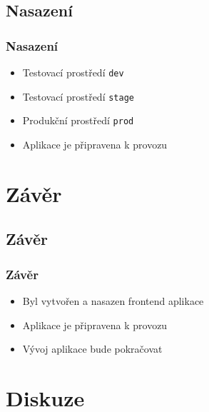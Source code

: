 \documentclass[a4paper]{beamer}
\begin{document}
\subsection*{Nasazení}
\begin{frame}
\frametitle{Nasazení}
\begin{itemize}
    \item Testovací prostředí \texttt{dev}
    \item Testovací prostředí \texttt{stage}
    \item Produkční prostředí \texttt{prod}
    \item Aplikace je připravena k provozu
\end{itemize}
\end{frame}

\section{Závěr}

\subsection*{Závěr}
\begin{frame}
\frametitle{Závěr}
\begin{itemize}
\item Byl vytvořen a nasazen frontend aplikace
\item Aplikace je připravena k provozu
\item Vývoj aplikace bude pokračovat
\end{itemize}
\end{frame}

\section*{Diskuze}
\end{document}
